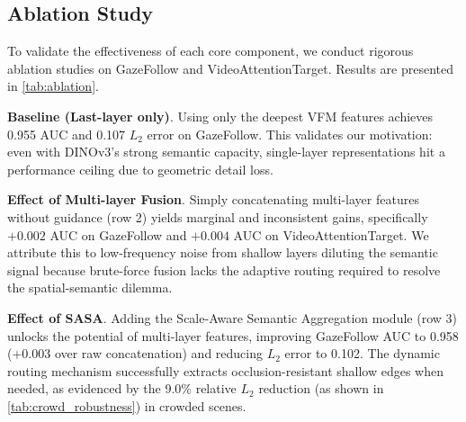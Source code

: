 \documentclass[sigconf,review,anonymous,screen]{acmart}
\begin{document}

\subsection{Ablation Study}
To validate the effectiveness of each core component, we conduct rigorous ablation studies on GazeFollow and VideoAttentionTarget. Results are presented in \autoref{tab:ablation}.

\textbf{Baseline (Last-layer only)}. Using only the deepest VFM features achieves 0.955 AUC and 0.107 $L_2$ error on GazeFollow. This validates our motivation: even with DINOv3's strong semantic capacity, single-layer representations hit a performance ceiling due to geometric detail loss.

\textbf{Effect of Multi-layer Fusion}. Simply concatenating multi-layer features without guidance (row 2) yields marginal and inconsistent gains, specifically \(+0.002\) AUC on GazeFollow and \(+0.004\) AUC on VideoAttentionTarget. We attribute this to low-frequency noise from shallow layers diluting the semantic signal because brute-force fusion lacks the adaptive routing required to resolve the spatial-semantic dilemma.

\textbf{Effect of SASA}. Adding the Scale-Aware Semantic Aggregation module (row 3) unlocks the potential of multi-layer features, improving GazeFollow AUC to 0.958 (+0.003 over raw concatenation) and reducing $L_2$ error to 0.102. The dynamic routing mechanism successfully extracts occlusion-resistant shallow edges when needed, as evidenced by the 9.0\% relative $L_2$ reduction (as shown in \autoref{tab:crowd_robustness}) in crowded scenes.
\end{document}
